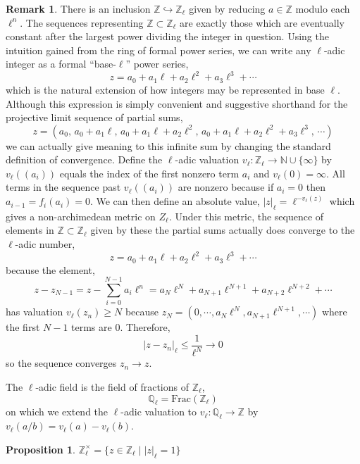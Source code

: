 \documentclass{article}
\newcommand{\Z}{\mathbb{Z}}
\newcommand{\Q}{\mathbb{Q}}
\newcommand{\N}{\mathbb{N}}
\theoremstyle{definition}
\newtheorem{proposition}[theorem]{Proposition}
\newtheorem{remark}{Remark}[section]
\newenvironment{definition}[1][Definition:]{\begin{trivlist}
\item[\hskip \labelsep {\bfseries #1}]}{\end{trivlist}}
\begin{document}
\begin{remark}
There is an inclusion $\Z \hookrightarrow \Z_{\ell}$ given by reducing $a \in \Z$ modulo each $\ell^n$. The sequences representing $\Z \subset \Z_{\ell}$ are exactly those which are eventually constant after the largest power dividing the integer in question. Using the intuition gained from the ring of formal power series, we can write any $\ell$-adic integer as a formal ``base-$\ell$'' power series,
\[ z = a_0 + a_1 \ell + a_2 \ell^2 + a_3 \ell^3 + \cdots \]
which is the natural extension of how integers may be represented in base $\ell$. 
Although this expression is simply convenient and suggestive shorthand for the projective limit sequence of partial sums,
\[ z = (a_0, \, a_0 + a_1 \ell, \, a_0 + a_1 \ell + a_2 \ell^2, \, a_0 + a_1 \ell + a_2 \ell^2 + a_3 \ell^3, \, \cdots) \] 
we can actually give meaning to this infinite sum by changing the standard definition of convergence. Define the $\ell$-adic valuation $v_{\ell} : \Z_{\ell} \to \N \cup \{ \infty \}$ by $v_{\ell}((a_i))$ equals the index of the first nonzero term $a_i$ and $v_{\ell}(0) = \infty$. All terms in the sequence past $v_{\ell}((a_i))$ are nonzero because if $a_i = 0$ then $a_{i-1} = f_i(a_i) = 0$. We can then define an absolute value, $|z|_{\ell} = \ell^{-v_{\ell}(z)}$ which gives a non-archimedean metric on $Z_{\ell}$. Under this metric, the sequence of elements in $\Z \subset \Z_{\ell}$ given by these the partial sums
actually does converge to the $\ell$-adic number,
\[ z = a_0 + a_1 \ell + a_2 \ell^2 + a_3 \ell^3 + \cdots \]
because the element,
\[ z - z_{N-1} = z - \sum_{i = 0}^{N-1} a_i \ell^n = a_N \ell^N + a_{N+1} \ell^{N+1} + a_{N+2} \ell^{N+2} + \cdots \]
has valuation $v_\ell(z_n) \ge N$ because $z_N = (0, \cdots, a_N \ell^N, a_{N+1} \ell^{N+1}, \cdots)$ where the first $N-1$ terms are $0$. Therefore, 
\[ |z - z_n|_{\ell} \le \frac{1}{\ell^N} \to 0 \]
so the sequence converges $z_n \to z$.
\end{remark}

\begin{definition}
The $\ell$-adic field is the field of fractions of $\Z_{\ell}$,
\[ \Q_{\ell} = \mathrm{Frac}(\Z_{\ell}) \]
on which we extend the $\ell$-adic valuation to $v_{\ell} : \Q_{\ell} \to \Z$ by $v_{\ell}(a/b) = v_{\ell}(a) - v_{\ell}(b)$. 
\end{definition}

\begin{proposition}
$\Z_{\ell}^\times = \{ z \in \Z_{\ell} \mid |z|_{\ell} = 1 \}$
\end{proposition}
\end{document}
